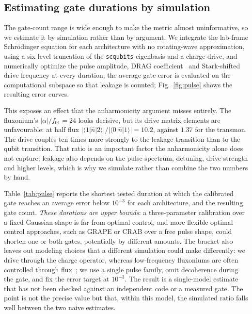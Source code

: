 \documentclass{SciPost}
\begin{document}
\subsection{Estimating gate durations by simulation}
\label{sec:pulse}

The gate-count range is wide enough to make the metric almost uninformative, so we estimate it
by simulation rather than by argument. We integrate the lab-frame Schr\"odinger equation for
each architecture with no rotating-wave approximation, using a six-level truncation of the
\texttt{scqubits} eigenbasis and a charge drive, and numerically optimize the pulse amplitude, DRAG coefficient~\cite{motzoi2009} and Stark-shifted
drive frequency at every duration; the average gate error is evaluated on the computational
subspace so that leakage is counted; Fig.~\ref{fig:pulse} shows the resulting error curves.

This exposes an effect that the anharmonicity argument misses entirely. The fluxonium's
$|\alpha|/f_{01} = 24$ looks decisive, but its drive matrix elements are unfavourable: at
half flux $|\langle 1|\hat n|2\rangle| / |\langle 0|\hat n|1\rangle| = 10.2$, against $1.37$
for the transmon. The drive couples ten times more strongly to the leakage transition than to
the qubit transition. That ratio is an important factor the anharmonicity alone does not
capture; leakage also depends on the pulse spectrum, detuning, drive strength and higher levels,
which is why we simulate rather than combine the two numbers by hand.

Table~\ref{tab:pulse} reports the shortest tested duration at which the calibrated gate reaches an
average error below
$10^{-3}$ for each architecture, and the resulting gate count. \emph{These durations are upper
bounds}: a three-parameter calibration over a fixed Gaussian shape is far from optimal
control, and more flexible optimal-control approaches, such as GRAPE or CRAB over a free pulse shape, could
shorten one or both gates, potentially by different amounts. The bracket also leaves out modeling choices that a different simulation could make
differently: we drive through the charge operator, whereas low-frequency fluxoniums are often
controlled through flux~\cite{zhang2021}; we use a single pulse family, omit decoherence during
the gate, and fix the error target at $10^{-3}$. The result is a single-model estimate that has
not been checked against an independent code or a measured gate. The point is not the precise
value but that, within this model, the simulated ratio falls well between the two naive
estimates.
\end{document}
